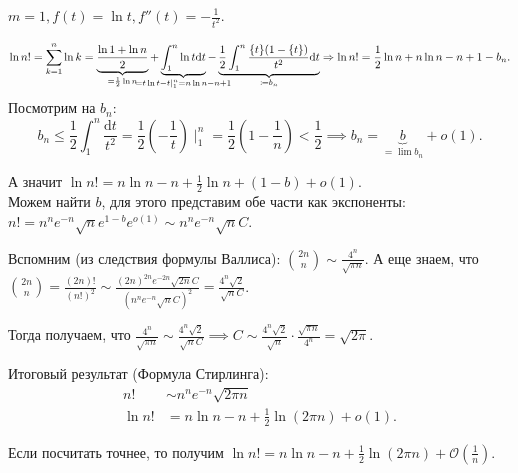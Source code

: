 \begin{example}
    $m = 1, f(t) = \ln t, f''(t) = -\frac{1}{t^2}$.

    \[
        \ln n! = \sum_{k=1}^n \ln k = \underbrace{\frac{\ln 1 + \ln n}{2}}_{= \frac{1}{2} \ln n} + \underbrace{\int_1^n \ln t \mathrm{d}t}_{\mathclap{=t\ln t-t\mid_1^n = n\ln n - n + 1}} - \underbrace{\frac{1}{2} \int_1^n \frac{\{t\}(1-\{t\})}{t^2} \mathrm{d}t}_{\coloneqq b_n} \Rightarrow \ln n! = \frac{1}{2} \ln n + n \ln n - n + 1 - b_n
    .\] 
    Посмотрим на $b_n$:  \[
        b_n \le \frac{1}{2} \int_1^n \frac{\mathrm{d}t}{t^2} = \frac{1}{2} (-\frac{1}{t}) \mid_1^n = \frac{1}{2} (1-\frac{1}{n}) < \frac{1}{2} \implies b_n = \underbrace{b}_{=\lim b_n} + o(1)
    .\] 

    А значит $\ln n! = n \ln n - n + \frac{1}{2} \ln n + (1-b) + o(1)$. \\
    Можем найти $b$, для этого представим обе части как экспоненты: $n! = n^n e^{-n} \sqrt{n} e^{1-b} e^{o(1)} \sim n^n e^{-n} \sqrt{n} C$.

    Вспомним (из следствия формулы Валлиса): $\binom{2n}{n} \sim \frac{4^n}{\sqrt{\pi n}}$. А еще знаем, что $\binom{2n}{n} = \frac{(2n)!}{(n!)^2} \sim \frac{(2n)^{2n}e^{-2n}\sqrt{2n}C}{(n^n e^{-n}\sqrt{n}C)^2} = \frac{4^n \sqrt{2}}{\sqrt{n}C}$.

    Тогда получаем, что $\frac{4^n}{\sqrt{\pi n}} \sim \frac{4^n \sqrt{2}}{\sqrt{n}C} \implies C \sim \frac{4^n \sqrt{2}}{\sqrt{n}} \cdot \frac{\sqrt{\pi n}}{4^n} = \sqrt{2\pi}$.

    Итоговый результат (Формула Стирлинга): \begin{align*}
        n! &\sim n^n e^{-n} \sqrt{2\pi n}\\
        \ln n! &= n \ln n - n + \frac{1}{2} \ln (2\pi n) + o(1)
    .\end{align*}
\end{example}
\begin{remark}
    Если посчитать точнее, то получим $\ln n! = n \ln n - n + \frac{1}{2} \ln(2 \pi n) + \mathcal{O}(\frac{1}{n})$.
\end{remark}
